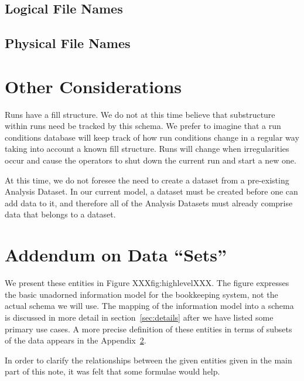 \documentclass[pdftex]{cmspaper}
\begin{document}
{\subsection{Logical File Names}
\subsection{Physical File Names}

\section{Other Considerations}

Runs have a fill structure.  We do not at this time believe that
substructure within runs need be tracked by this schema.  We prefer
to imagine that a run conditions database will keep track of how run
conditions change in a regular way taking into account a known fill
structure.  Runs will change when irregularities occur and cause the
operators to shut down the current run and start a new one.

At this time, we do not foresee the need to create a dataset from a
pre-existing Analysis Dataset.  In our current model, a dataset must be
created before one can add data to it, and therefore all of the Analysis
Datasets must already comprise data that belongs to a dataset.


\appendix



\section{Addendum on Data ``Sets''}\label{appendix}




We present these entities in Figure XXXfig:highlevelXXX.
The figure expresses the basic unadorned information model
for the bookkeeping system, not the actual schema we will use.
The mapping of the information model into a schema is discussed in more
detail in section~\ref{sec:details} after we have listed some primary use
cases.  A more precise definition of these entities in terms of subsets of
the data appears in the Appendix~\ref{appendix}.



In order to clarify the relationships between the given entities given
in the main part of this note, it was felt that some formulae would help.

}
\end{document}
